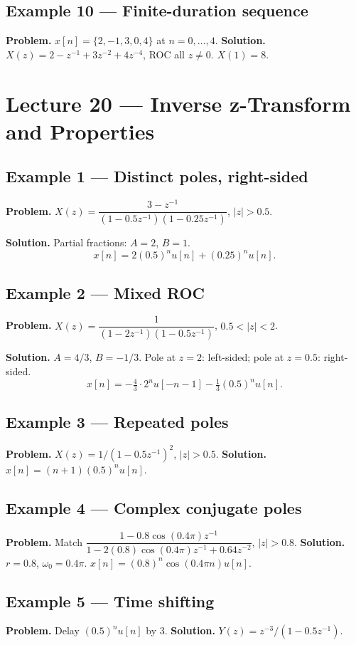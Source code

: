 \documentclass[11pt]{article}
\begin{document}
\subsection{Example 10 --- Finite-duration sequence}
\textbf{Problem.} $x[n]=\{2,-1,3,0,4\}$ at $n=0,\ldots,4$.
\textbf{Solution.} $X(z)=2-z^{-1}+3z^{-2}+4z^{-4}$, ROC all $z\ne 0$. $X(1)=8$.

\section{Lecture 20 --- Inverse z-Transform and Properties}

\subsection{Example 1 --- Distinct poles, right-sided}
\textbf{Problem.} $X(z)=\dfrac{3-z^{-1}}{(1-0.5 z^{-1})(1-0.25 z^{-1})}$, $|z|>0.5$.

\textbf{Solution.} Partial fractions: $A=2$, $B=1$.
\[x[n]=2(0.5)^n u[n]+(0.25)^n u[n].\]

\subsection{Example 2 --- Mixed ROC}
\textbf{Problem.} $X(z)=\dfrac{1}{(1-2z^{-1})(1-0.5 z^{-1})}$, $0.5<|z|<2$.

\textbf{Solution.} $A=4/3$, $B=-1/3$. Pole at $z=2$: left-sided; pole at $z=0.5$: right-sided.
\[x[n]=-\tfrac{4}{3}\cdot 2^n u[-n-1]-\tfrac{1}{3}(0.5)^n u[n].\]

\subsection{Example 3 --- Repeated poles}
\textbf{Problem.} $X(z)=1/(1-0.5 z^{-1})^2$, $|z|>0.5$.
\textbf{Solution.} $x[n]=(n+1)(0.5)^n u[n]$.

\subsection{Example 4 --- Complex conjugate poles}
\textbf{Problem.} Match $\dfrac{1-0.8\cos(0.4\pi)z^{-1}}{1-2(0.8)\cos(0.4\pi)z^{-1}+0.64 z^{-2}}$, $|z|>0.8$.
\textbf{Solution.} $r=0.8$, $\omega_0=0.4\pi$. $x[n]=(0.8)^n\cos(0.4\pi n)u[n]$.

\subsection{Example 5 --- Time shifting}
\textbf{Problem.} Delay $(0.5)^n u[n]$ by 3.
\textbf{Solution.} $Y(z)=z^{-3}/(1-0.5 z^{-1})$.
\end{document}
